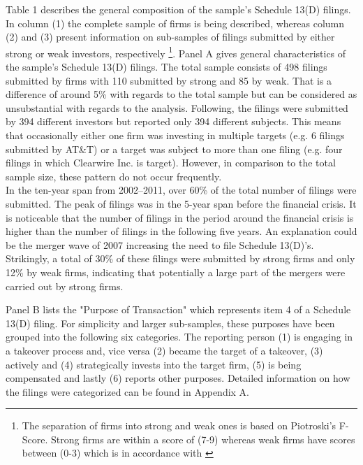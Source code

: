 \documentclass[12pt]{article}
\begin{document}
Table 1 describes the general composition of the sample's Schedule 13(D) filings. In column (1) the complete sample of firms is being described, whereas column (2) and (3) present information on sub-samples of filings submitted by either strong or weak investors, respectively
	\footnote{The separation of firms into strong and weak ones is based on Piotroski's F-Score. Strong firms are within a score of (7-9) whereas weak firms have scores between (0-3) which is in accordance with \citet[p.12]{Mohr2012}}.
Panel A gives general characteristics of the sample's Schedule 13(D) filings. The total sample consists of 498 filings submitted by firms with 110 submitted by strong and 85 by weak. That is a difference of around 5\% with regards to the total sample but can be considered as unsubstantial with regards to the analysis. 
Following, the filings were submitted by 394 different investors but reported only 394 different subjects. This means that occasionally either one firm was investing in multiple targets (e.g. 6 filings submitted by AT\&T) or a target was subject to more than one filing (e.g. four filings in which Clearwire Inc. is target). However, in comparison to the total sample size, these pattern do not occur frequently.\\
In the ten-year span from 2002--2011, over 60\% of the total number of filings were submitted. The peak of filings was in the 5-year span before the financial crisis. It is noticeable that the number of filings in the period around the financial crisis is higher than the number of filings in the following five years. An explanation could be the merger wave of 2007 \citep[p.19]{Huang2017} increasing the need to file Schedule 13(D)'s. Strikingly, a total of 30\% of these filings were submitted by strong firms and only 12\% by weak firms, indicating that potentially a large part of the mergers were carried out by strong firms.
	
Panel B lists the "Purpose of Transaction" which represents item 4 of a Schedule 13(D) filing. For simplicity and larger sub-samples, these purposes have been grouped into the following six categories. The reporting person (1) is engaging in a takeover process and, vice versa (2) became the target of a takeover, (3) actively and (4) strategically invests into the target firm, (5) is being compensated and lastly (6) reports other purposes. Detailed information on how the filings were categorized can be found in Appendix A.
\end{document}
